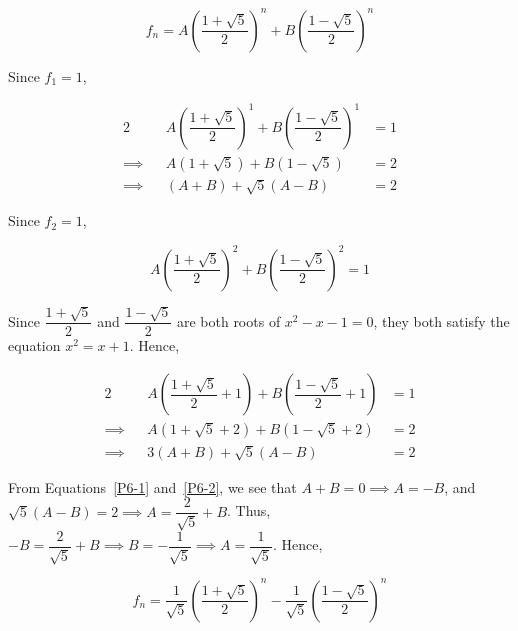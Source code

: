 \documentclass{jhwhw}
\begin{document}
            \begin{equation*}
                f_n = A \left(\dfrac{1 + \sqrt5}{2}\right)^n + B \left(\dfrac{1 - \sqrt5}{2}\right)^n
            \end{equation*}

            Since $f_1 = 1$,

            \begin{alignat}{2}
                &&A \left(\dfrac{1 + \sqrt5}{2}\right)^1 + B  \left(\dfrac{1 - \sqrt5}{2}\right)^1 &= 1\nonumber\\
                \implies&&A (1 + \sqrt5) + B (1 - \sqrt5) &= 2\nonumber\\
                \implies&&(A + B) + \sqrt5(A - B) &= 2\label{P6-1}
            \end{alignat}

            Since $f_2 = 1$,

            \begin{equation*}
                A \left(\dfrac{1 + \sqrt5}{2}\right)^2 + B \left(\dfrac{1 - \sqrt5}{2}\right)^2 = 1
            \end{equation*}

            Since $\dfrac{1 + \sqrt5}{2}$ and $\dfrac{1 - \sqrt5}{2}$ are both roots of $x^2 - x - 1 = 0$, they both satisfy the equation $x^2 = x + 1$. Hence,

            \begin{alignat}{2}
                && A \left(\dfrac{1 + \sqrt5}{2} + 1\right) + B \left(\dfrac{1 - \sqrt5}{2} + 1\right) &= 1\nonumber\\
                \implies&& A (1 + \sqrt5 + 2) + B (1 - \sqrt5 + 2) &= 2\nonumber\\
                \implies&&3(A + B) + \sqrt5 (A - B) &= 2\label{P6-2}
            \end{alignat}

            From Equations~\ref{P6-1} and~\ref{P6-2}, we see that $A + B = 0 \implies A = -B$, and $\sqrt5 (A - B) = 2 \implies A = \dfrac2{\sqrt5} + B$. Thus, $-B = \dfrac2{\sqrt5} + B \implies B = -\dfrac1{\sqrt5} \implies A = \dfrac1{\sqrt5}$. Hence,

            \begin{equation*}
                f_n = \dfrac1{\sqrt5} \left(\dfrac{1 + \sqrt5}{2}\right)^n - \dfrac1{\sqrt5} \left(\dfrac{1 - \sqrt5}{2}\right)^n
            \end{equation*}

\end{document}
